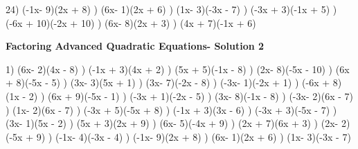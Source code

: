 \documentclass{article}%
\begin{document}
24) (-1x- 9)(2x + 8)%
) (6x- 1)(2x + 6)%
) (1x- 3)(-3x - 7)%
) (-3x + 3)(-1x + 5)%
) (-6x + 10)(-2x + 10)%
) (6x- 8)(2x + 3)%
) (4x + 7)(-1x + 6)%
\newline%
\newpage%
\large%
\begin{center}%
\textbf{Factoring Advanced Quadratic Equations- Solution 2}%
\newline%
\end{center} \normalsize%
1) (6x- 2)(4x - 8)%
) (-1x + 3)(4x + 2)%
) (5x + 5)(-1x - 8)%
) (2x- 8)(-5x - 10)%
) (6x + 8)(-5x - 5)%
) (3x- 3)(5x + 1)%
) (3x- 7)(-2x - 8)%
) (-3x- 1)(-2x + 1)%
) (-6x + 8)(1x - 2)%
) (6x + 9)(-5x - 1)%
) (-3x + 1)(-2x - 5)%
) (3x- 8)(-1x - 8)%
) (-3x- 2)(6x - 7)%
) (1x- 2)(6x - 7)%
) (-3x + 5)(-5x + 8)%
) (-1x + 3)(3x - 6)%
) (-3x + 3)(-5x - 7)%
) (3x- 1)(5x - 2)%
) (5x + 3)(2x + 9)%
) (6x- 5)(-4x + 9)%
) (2x + 7)(6x + 3)%
) (2x- 2)(-5x + 9)%
) (-1x- 4)(-3x - 4)%
) (-1x- 9)(2x + 8)%
) (6x- 1)(2x + 6)%
) (1x- 3)(-3x - 7)%
\newline%
\end{document}
